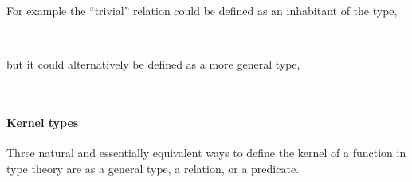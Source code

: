 \documentclass[a4paper,USenglish,cleveref,autoref,thm-restate]{lipics-v2019}
\begin{document}
For example the ``trivial'' relation could be defined as an inhabitant of the \AgdaSpace{}\AgdaSpace{} type,
\begin{code}
\>[0]\AgdaSpace{}%
\AgdaSymbol{:}\AgdaSpace{}%
\AgdaSymbol{\{}\AgdaSpace{}%
\AgdaSymbol{:}\AgdaSpace{}%
\AgdaSpace{}%
\AgdaSpace{}%
\AgdaSymbol{\}}\AgdaSpace{}%
\AgdaSpace{}%
\AgdaSpace{}%
\AgdaSpace{}%
\<%
\\
\>[0]\AgdaSpace{}%
\AgdaSpace{}%
\AgdaSpace{}%
\AgdaSymbol{=}\AgdaSpace{}%
\AgdaSpace{}%
\AgdaSpace{}%
\<%
\end{code}
but it could alternatively be defined as a more general type,
\begin{code}
\>[0]\AgdaSpace{}%
\AgdaSymbol{:}\AgdaSpace{}%
\AgdaSymbol{\{}\AgdaSpace{}%
\AgdaSymbol{:}\AgdaSpace{}%
\AgdaSpace{}%
\AgdaSpace{}%
\AgdaSymbol{\}}\AgdaSpace{}%
\AgdaSpace{}%
\AgdaSpace{}%
\<%
\\
\>[0]\AgdaSymbol{\{}\AgdaSymbol{\}}\AgdaSpace{}%
\AgdaSymbol{\{}\AgdaSymbol{\}}\AgdaSpace{}%
\AgdaSymbol{=}\AgdaSpace{}%
\AgdaSpace{}%
\AgdaSpace{}%
\AgdaSpace{}%
\AgdaSpace{}%
\AgdaFunction{,}\AgdaSpace{}%
\AgdaSpace{}%
\AgdaSpace{}%
\AgdaSpace{}%
\AgdaSpace{}%
\AgdaFunction{,}\AgdaSpace{}%
\AgdaSpace{}%
\AgdaSpace{}%
\<%
\end{code}

\paragraph*{Kernel types}
Three natural and essentially equivalent ways to define the kernel of a function in type theory are as a general type, a relation, or a predicate.
\begin{code}\end{code}
\end{document}
